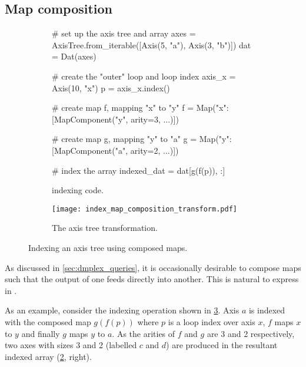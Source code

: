 \documentclass[thesis]{subfiles}
\begin{document}
\subsection{Map composition}
\label{sec:indexing_map_composition}

\begin{figure}
  \centering

  \begin{subfigure}{.9\textwidth}
    \begin{pyalg2}
      # set up the axis tree and array
      axes = AxisTree.from_iterable([Axis(5, "a"), Axis(3, "b")])
      dat = Dat(axes)

      # create the "outer" loop and loop index
      axis_x = Axis(10, "x")
      p = axis_x.index()

      # create map f, mapping "x" to "y"
      f = Map({"x": [MapComponent("y", arity=3, ...)]})

      # create map g, mapping "y" to "a"
      g = Map({"y": [MapComponent("a", arity=2, ...)]})

      # index the array
      indexed_dat = dat[g(f(p)), :]
    \end{pyalg2}

    \caption{ indexing code.}
    \label{fig:index_map_composition_code}
  \end{subfigure}

  \vspace{1em}

  \begin{subfigure}{\textwidth}
    \centering
    \texttt{[image: index\_map\_composition\_transform.pdf]}
    \caption{
      The axis tree transformation.
    }
    \label{fig:index_map_composition_transform}
  \end{subfigure}
  \caption{Indexing an axis tree using composed maps.}
  \label{fig:index_map_composition}
\end{figure}

As discussed in \cref{sec:dmplex_queries}, it is occasionally desirable to compose maps such that the output of one feeds directly into another.
This is natural to express in .

As an example, consider the indexing operation shown in \cref{fig:index_map_composition}.
Axis $a$ is indexed with the composed map $g(f(p))$ where $p$ is a loop index over axis $x$, $f$ maps $x$ to $y$ and finally $g$ maps $y$ to $a$.
As the arities of $f$ and $g$ are 3 and 2 respectively, two axes with sizes 3 and 2 (labelled $c$ and $d$) are produced in the resultant indexed array (\ref{fig:index_map_composition_transform}, right).
\end{document}
